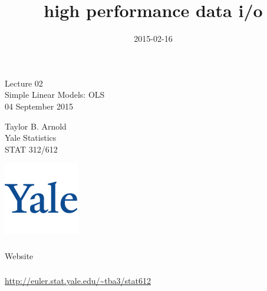 

\title{high performance data i/o}
\date{2015-02-16}



\begin{frame}[fragile] \frametitle{}

\vfill

{\fontsize{0.7cm}{0cm}\selectfont Lecture 02 \\\vspace{0.2cm} Simple Linear Models: OLS}\\\vspace{0.5cm}
04 September 2015

\vspace{2cm}

\begin{minipage}{0.6\textwidth}
Taylor B. Arnold \\
Yale Statistics \\
STAT 312/612
\end{minipage}
\hfill
\begin{minipage}{0.3\textwidth}\raggedleft
\includegraphics[scale=0.3]{../yale-logo.png}
\end{minipage}%

\end{frame}

\begin{frame}[fragile] \frametitle{}

\begin{flushright}
{\color{yaleblue}\sc\fontsize{1cm}{0cm}\selectfont Website}
\end{flushright}

\end{frame}


\begin{frame}[fragile] \frametitle{}

{\fontsize{0.5cm}{0cm}\selectfont
\url{http://euler.stat.yale.edu/~tba3/stat612}
}

\end{frame}

